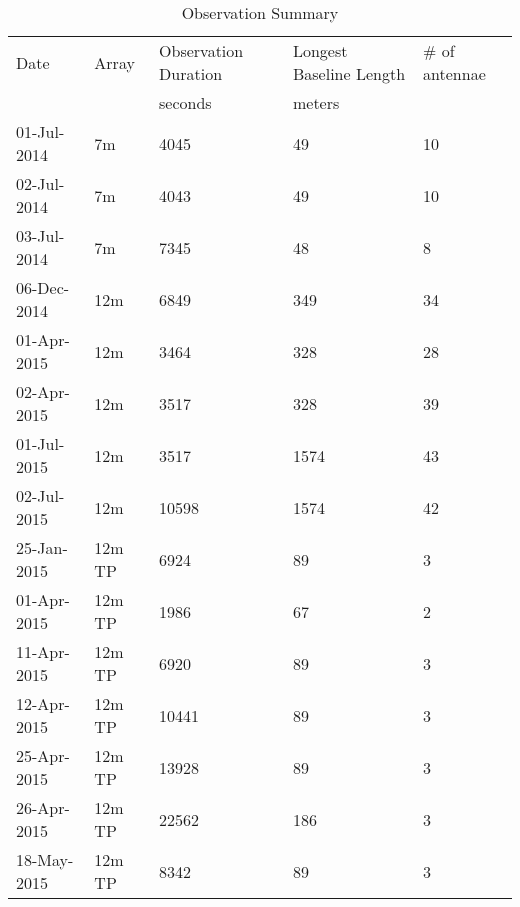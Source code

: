 \documentclass[twocolumn]{aastex61}
\begin{document}
\begin{table*}[htp]
\centering
\caption{Observation Summary}
\begin{tabular}{lllll}
\label{tab:observations}
Date & Array & Observation Duration &  Longest Baseline Length  & \# of antennae\\
     &       & seconds              & meters                    & \\
\hline
01-Jul-2014 & 7m & 4045 & 49 & 10\\
02-Jul-2014 & 7m & 4043 & 49 & 10\\
03-Jul-2014 & 7m & 7345 & 48 & 8\\
06-Dec-2014 & 12m & 6849 & 349 & 34\\
01-Apr-2015 & 12m & 3464 & 328 & 28\\
02-Apr-2015 & 12m & 3517 & 328 & 39\\
01-Jul-2015 & 12m & 3517 & 1574 & 43\\
02-Jul-2015 & 12m & 10598 & 1574 & 42\\

\hline

25-Jan-2015 & 12m TP & 6924 & 89 & 3\\
01-Apr-2015 & 12m TP & 1986 & 67 & 2\\
11-Apr-2015 & 12m TP & 6920 & 89 & 3\\
12-Apr-2015 & 12m TP & 10441 & 89 & 3\\
25-Apr-2015 & 12m TP & 13928 & 89 & 3\\
26-Apr-2015 & 12m TP & 22562 & 186 & 3\\
18-May-2015 & 12m TP & 8342 & 89 & 3\\
\hline
\end{tabular}
\end{table*}
\end{document}
